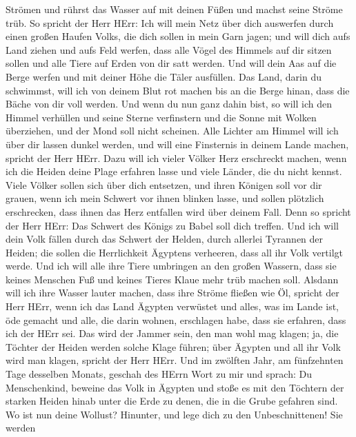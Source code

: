 Strömen und rührst das Wasser auf mit deinen Füßen und machst seine
Ströme trüb.  So spricht der Herr HErr: Ich will mein Netz
über dich auswerfen durch einen großen Haufen Volks, die dich sollen in
mein Garn jagen;  und will dich aufs Land ziehen und aufs
Feld werfen, dass alle Vögel des Himmels auf dir sitzen sollen und alle
Tiere auf Erden von dir satt werden.  Und will dein Aas auf
die Berge werfen und mit deiner Höhe die Täler ausfüllen. 
Das Land, darin du schwimmst, will ich von deinem Blut rot machen bis an
die Berge hinan, dass die Bäche von dir voll werden.  Und
wenn du nun ganz dahin bist, so will ich den Himmel verhüllen und seine
Sterne verfinstern und die Sonne mit Wolken überziehen, und der Mond
soll nicht scheinen.  Alle Lichter am Himmel will ich über
dir lassen dunkel werden, und will eine Finsternis in deinem Lande
machen, spricht der Herr HErr.  Dazu will ich vieler Völker
Herz erschreckt machen, wenn ich die Heiden deine Plage erfahren lasse
und viele Länder, die du nicht kennst.  Viele Völker sollen
sich über dich entsetzen, und ihren Königen soll vor dir grauen, wenn
ich mein Schwert vor ihnen blinken lasse, und sollen plötzlich
erschrecken, dass ihnen das Herz entfallen wird über deinem Fall.
 Denn so spricht der Herr HErr: Das Schwert des Königs zu
Babel soll dich treffen.  Und ich will dein Volk fällen
durch das Schwert der Helden, durch allerlei Tyrannen der Heiden; die
sollen die Herrlichkeit Ägyptens verheeren, dass all ihr Volk vertilgt
werde.  Und ich will alle ihre Tiere umbringen an den
großen Wassern, dass sie keines Menschen Fuß und keines Tieres Klaue
mehr trüb machen soll.  Alsdann will ich ihre Wasser lauter
machen, dass ihre Ströme fließen wie Öl, spricht der Herr HErr,
 wenn ich das Land Ägypten verwüstet und alles, was im
Lande ist, öde gemacht und alle, die darin wohnen, erschlagen habe, dass
sie erfahren, dass ich der HErr sei.  Das wird der Jammer
sein, den man wohl mag klagen; ja, die Töchter der Heiden werden solche
Klage führen; über Ägypten und all ihr Volk wird man klagen, spricht der
Herr HErr.  Und im zwölften Jahr, am fünfzehnten Tage
desselben Monats, geschah des HErrn Wort zu mir und sprach:
 Du Menschenkind, beweine das Volk in Ägypten und stoße es
mit den Töchtern der starken Heiden hinab unter die Erde zu denen, die
in die Grube gefahren sind.  Wo ist nun deine Wollust?
Hinunter, und lege dich zu den Unbeschnittenen!  Sie werden
